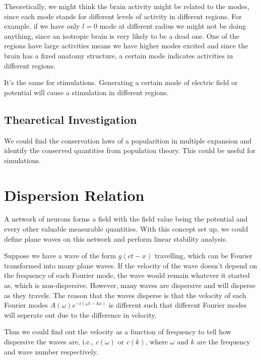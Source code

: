 \documentclass[letterpaper,10pt,english]{sphinxmanual}
\begin{document}
Theoretically, we might think the brain activity might be related to the modes, since each mode stands for different levels of activity in different regions. For example, if we have only \(l=0\) mode at different radius we might not be doing anything, since an isotropic brain is very likely to be a dead one. One of the regions have large activities means we have higher modes excited and since the brain has a fixed anatomy structure, a certain mode indicates activities in different regions.

It’s the same for stimulations. Generating a certain mode of electric field or potential will cause a stimulation in different regions.


\subsection{Thearetical Investigation}
\label{\detokenize{neuroscience/signal-decomposition:thearetical-investigation}}
We could find the conservation laws of a popularition in multiple expansion and identify the conserved quantities from population theory. This could be useful for simulations.


\section{Dispersion Relation}
\label{\detokenize{neuroscience/dispersion-relation:dispersion-relation}}\label{\detokenize{neuroscience/dispersion-relation::doc}}
A network of neurons forms a field with the field value being the potential and every other valuable measurable quantities. With this concept set up, we could define plane waves on this network and perform linear stability analysis.

Suppose we have a wave of the form \(g(c t - x)\) travelling, which can be Fourier transformed into many plane waves. If the velocity of the wave doesn’t depend on the frequency of each Fourier mode, the wave would remain whatever it started as, which is non-dispersive. However, many waves are dispersive and will disperse as they travels. The reason that the waves disperse is that the velocity of each Fourier modes \(A(\omega)e^{-i (\omega t - k x )}\) is different such that different Fourier modes will seperate out due to the difference in velocity.

Thus we could find out the velocity as a function of frequency to tell how dispersive the waves are, i.e., \(c(\omega)\) or \(c(k)\), where \(\omega\) and \(k\) are the frequency and wave number respectively.
\end{document}
